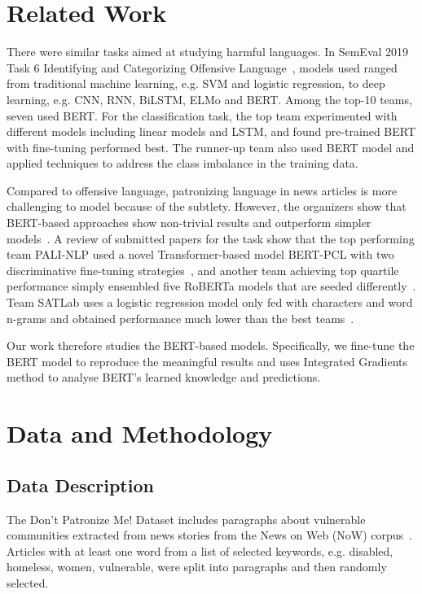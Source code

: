 \documentclass[11pt]{article}
\begin{document}
\section{Related Work}

There were similar tasks aimed at studying harmful languages. In SemEval 2019 Task 6 Identifying and Categorizing Offensive Language~\cite{zampieri2019semeval}, models used ranged from traditional machine learning, e.g. SVM and logistic regression, to deep learning, e.g. CNN, RNN, BiLSTM, ELMo and BERT. Among the top-10 teams, seven used BERT. For the classification task, the top team experimented with different models including linear models and LSTM, and found pre-trained BERT with fine-tuning performed best. The runner-up team also used BERT model and applied techniques to address the class imbalance in the training data.

Compared to offensive language, patronizing language in news articles is more challenging to model because of the subtlety. However, the organizers show that BERT-based approaches show non-trivial results and outperform simpler models~\cite{perez2020don}. A review of submitted papers for the task show that the top performing team PALI-NLP used a novel Transformer-based model BERT-PCL with two discriminative fine-tuning strategies~\cite{hu2022pali}, and another team achieving top quartile performance simply ensembled five RoBERTa models that are seeded differently~\cite{zhao2022utsa}. Team SATLab uses a logistic regression model only fed with characters and word n-grams and obtained performance much lower than the best teams~\cite{bestgen2022satlab}.

Our work therefore studies the BERT-based models. Specifically, we fine-tune the BERT model to reproduce the meaningful results and uses Integrated Gradients~\cite{sundararajan2017axiomatic} method to analyse BERT's learned knowledge and predictions.

\section{Data and Methodology}

\subsection{Data Description}

The Don’t Patronize Me! Dataset includes paragraphs about vulnerable communities extracted from news stories from the News on Web (NoW) corpus~\cite{davies2013corpus}. Articles with at least one word from a list of selected keywords, e.g. disabled, homeless, women, vulnerable, were split into paragraphs and then randomly selected.
\end{document}
